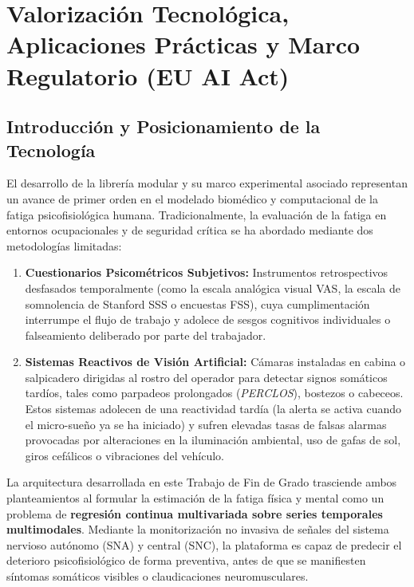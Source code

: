 
\chapter{Valorización Tecnológica, Aplicaciones Prácticas y Marco Regulatorio (EU AI Act)}
\label{cap:valorizacion_casos}

\section{Introducción y Posicionamiento de la Tecnología}
\label{sec:val_introduccion}

El desarrollo de la librería modular  y su marco experimental asociado representan un avance de primer orden en el modelado biomédico y computacional de la fatiga psicofisiológica humana. Tradicionalmente, la evaluación de la fatiga en entornos ocupacionales y de seguridad crítica se ha abordado mediante dos metodologías limitadas:
\begin{enumerate}
    \item \textbf{Cuestionarios Psicométricos Subjetivos:} Instrumentos retrospectivos desfasados temporalmente (como la escala analógica visual VAS, la escala de somnolencia de Stanford SSS o encuestas FSS), cuya cumplimentación interrumpe el flujo de trabajo y adolece de sesgos cognitivos individuales o falseamiento deliberado por parte del trabajador.
    \item \textbf{Sistemas Reactivos de Visión Artificial:} Cámaras instaladas en cabina o salpicadero dirigidas al rostro del operador para detectar signos somáticos tardíos, tales como parpadeos prolongados (\textit{PERCLOS}), bostezos o cabeceos. Estos sistemas adolecen de una reactividad tardía (la alerta se activa cuando el micro-sueño ya se ha iniciado) y sufren elevadas tasas de falsas alarmas provocadas por alteraciones en la iluminación ambiental, uso de gafas de sol, giros cefálicos o vibraciones del vehículo.
\end{enumerate}

La arquitectura desarrollada en este Trabajo de Fin de Grado trasciende ambos planteamientos al formular la estimación de la fatiga física y mental como un problema de \textbf{regresión continua multivariada sobre series temporales multimodales}. Mediante la monitorización no invasiva de señales del sistema nervioso autónomo (SNA) y central (SNC), la plataforma es capaz de predecir el deterioro psicofisiológico de forma preventiva, antes de que se manifiesten síntomas somáticos visibles o claudicaciones neuromusculares.


